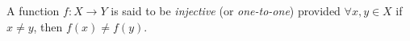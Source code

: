 \guard



\begin{defn}
\label{defn:injective}
  A function $f:X\to Y$ is said to be \emph{injective} (or \emph{one-to-one}) provided $\forall x,y\in X$ if $x\not=y$, then $f(x)\not= f(y)$.
\end{defn}
